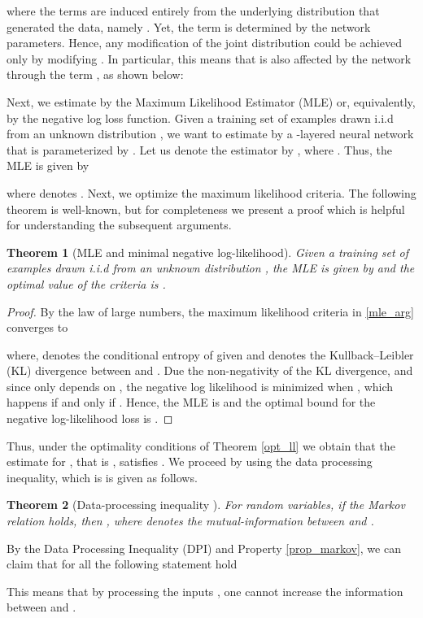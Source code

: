 \documentclass{article}
\newtheorem{theorem}{Theorem}
\newtheorem{proof}{Proof}
\begin{document}
where the terms  are induced entirely from the underlying distribution that generated the data, namely . Yet, the term  is determined by the network parameters. Hence, any modification of the joint distribution  could be achieved only by modifying . In particular, this means that  is also affected by the network through the term , as shown below: 
 
Next, we estimate  by the Maximum Likelihood Estimator (MLE) or, equivalently, by the negative log loss function.
Given a training set of  examples  drawn i.i.d from an unknown distribution , we want to estimate  by a -layered neural network that is parameterized by . Let us denote the estimator by , where . Thus, the MLE is given by

where  denotes . Next, we optimize the maximum likelihood criteria. 
The following theorem is well-known, but for completeness we present a proof which is helpful for understanding the subsequent arguments.
\begin{theorem}[MLE and minimal negative log-likelihood] \label{opt_ll}
Given a training set of  examples  drawn i.i.d from an unknown distribution , the MLE is given by  and the optimal value of the  criteria is .
\end{theorem}
\begin{proof}
By the law of large numbers, the maximum likelihood criteria in \eqref{mle_arg} converges to

where,  denotes the conditional entropy of  given  and  denotes the Kullback–Leibler (KL) divergence between  and . Due the non-negativity of the KL divergence, and since only  depends on , the negative log likelihood is minimized when , which happens if and only if . 
Hence, the MLE is  and the optimal bound for the negative log-likelihood loss is . 
\end{proof}
Thus, under the optimality conditions of Theorem \eqref{opt_ll} we obtain that the estimate for , that is , satisfies .
We proceed by using the data processing inequality, which is is given as follows.
\begin{theorem}[Data-processing inequality {\cite[section 2.8]{cover2012elements}}]
For  random variables, if the Markov relation  holds, then , where  denotes the mutual-information between  and .
\end{theorem}

By the Data Processing Inequality (DPI) and Property \eqref{prop_markov}, we can claim that for all  the following statement hold

This means that by processing the inputs , one cannot increase the information between  and .
\end{document}

